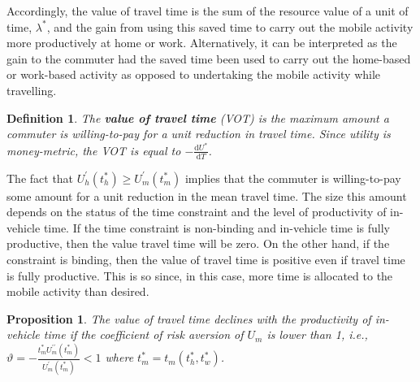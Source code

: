 \documentclass[12pt,a4paper,british]{article}
\newtheorem{definition}{Definition}[section]
\newtheorem{prop}{Proposition}[section]
\begin{document}
Accordingly, the value of travel time is the sum of the resource value of a unit of time, $\lambda^{\ast}$, and the gain from using this
saved time to carry out the mobile activity more productively at home or work. Alternatively, it can be interpreted as the gain to the commuter had the saved time been used to carry out the home-based or work-based activity as opposed to undertaking the mobile activity while travelling.

\begin{definition}
The \textbf{\textit{value of travel time}} (VOT) is the maximum amount a commuter is willing-to-pay for a unit reduction in travel time. Since utility is money-metric, the VOT is equal to $-\frac{ \mathrm{d} U^{\ast} } {\mathrm{d}T}$.
\end{definition}


The fact that $U_{h}^{\prime}\left(t_{h}^{*}\right)\geq U_{m}^{\prime}\left(t_{m}^{\ast}\right)$ implies that the commuter is willing-to-pay some amount for a unit reduction in the mean travel time. The size this amount depends on the status of the time constraint and the level of productivity of in-vehicle time. If the time constraint is non-binding and in-vehicle time is fully productive, then the value travel time will be zero. On the other hand, if the constraint is binding, then the value of travel time is positive even if travel time is fully productive. This is so since, in this case, more time is allocated to the mobile activity than desired. 

\begin{prop}
The value of travel time declines with the productivity of in-vehicle time if the coefficient of risk aversion of $U_{m}$ is lower than 1, i.e., $\vartheta=-\frac{t_{m}^{\ast}U_{m}^{\prime\prime}\left(t_{m}^{\ast}\right)}{U_{m}^{\prime}\left(t_{m}^{\ast}\right)}<1$ where $t_{m}^{\ast}=t_{m}\left(t_{h}^{\ast},t_{w}^{\ast}\right)$.
\end{prop}
\end{document}

